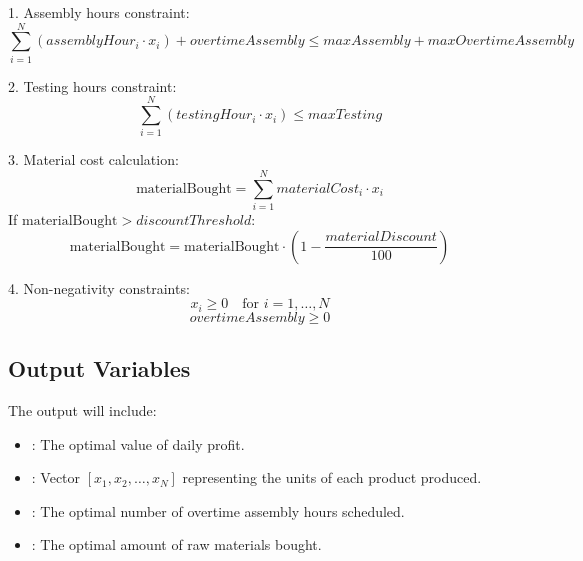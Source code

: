 \documentclass{article}
\begin{document}
1. Assembly hours constraint:
\[
\sum_{i=1}^{N} (assemblyHour_i \cdot x_i) + overtimeAssembly \leq maxAssembly + maxOvertimeAssembly
\]

2. Testing hours constraint:
\[
\sum_{i=1}^{N} (testingHour_i \cdot x_i) \leq maxTesting
\]

3. Material cost calculation:
\[
\text{materialBought} = \sum_{i=1}^{N} materialCost_i \cdot x_i
\]
If $\text{materialBought} > discountThreshold$:
\[
\text{materialBought} = \text{materialBought} \cdot (1 - \frac{materialDiscount}{100})
\]

4. Non-negativity constraints:
\[
x_i \geq 0 \quad \text{for } i = 1, \ldots, N
\]
\[
overtimeAssembly \geq 0
\]

\subsection*{Output Variables}
The output will include:
\begin{itemize}
    \item {}: The optimal value of daily profit.
    \item {}: Vector $[x_1, x_2, \ldots, x_N]$ representing the units of each product produced.
    \item {}: The optimal number of overtime assembly hours scheduled.
    \item {}: The optimal amount of raw materials bought.
\end{itemize}
\end{document}
